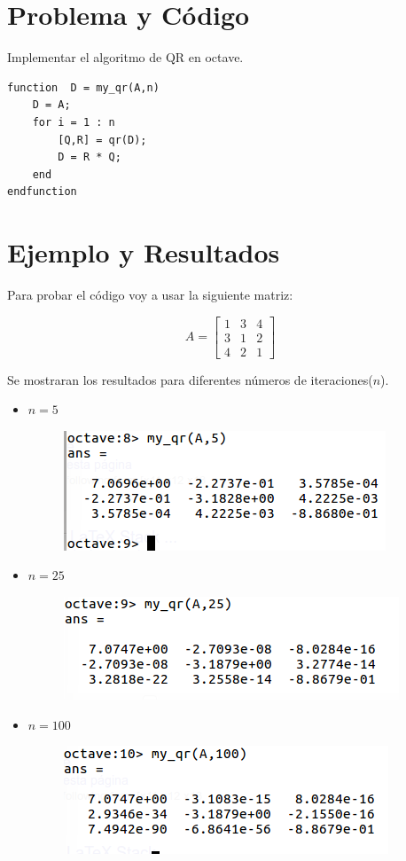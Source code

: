 \documentclass[a4paper,12pt]{article}
\begin{document}
\section{Problema y Código}

Implementar el algoritmo de QR en octave.


\begin{lstlisting}
function  D = my_qr(A,n)
	D = A;
	for i = 1 : n
		[Q,R] = qr(D);
		D = R * Q;
	end
endfunction
\end{lstlisting}

\section{Ejemplo y Resultados}

Para probar el código voy a usar la siguiente matriz:

\[ A = \left[ \begin{array}{ccc}
1 & 3 & 4 \\
3 & 1 & 2 \\
4 & 2 & 1 \end{array} \right]\] 

Se mostraran los resultados para diferentes números de iteraciones($n$).

\begin{itemize}
 \item $n=5$
 \begin{figure}[h]
  \centering
  \includegraphics[scale = 0.5]{1.png}
 \end{figure}
 \item $n=25$
 \begin{figure}[h]
  \centering
  \includegraphics[scale = 0.5]{2.png}
 \end{figure}
  \item $n=100$
  \begin{figure}[h]
   \centering
   \includegraphics[scale = 0.5]{3.png}
  \end{figure}

\end{itemize}
\end{document}
